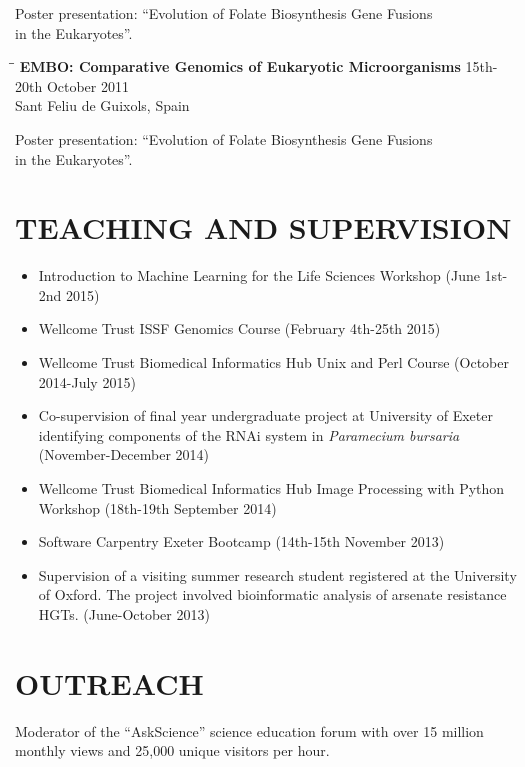 \documentclass{res}
\begin{document}
\begin{resume}
\begin{tabbing}
   \end{tabbing}\vspace{-20pt}      
      Poster presentation: ``Evolution of Folate Biosynthesis Gene Fusions \\in the Eukaryotes''.
      
  
  \vspace{-0.1in}
     \begin{tabbing} 
   \hspace{2in}\= \hspace{2.6in}\= \kill 
    {\bf EMBO: Comparative Genomics of Eukaryotic Microorganisms}
    \>  \> 15th-20th October 2011\\
                         \>    \> Sant Feliu de Guixols, Spain
   \end{tabbing}\vspace{-20pt}      
      Poster presentation: ``Evolution of Folate Biosynthesis Gene Fusions \\in the Eukaryotes''.

  \section{TEACHING AND SUPERVISION}
  \begin{itemize}
          \vspace{-1pt}
      \item Introduction to Machine Learning for the Life Sciences Workshop (June 1st-2nd 2015)
      \item Wellcome Trust ISSF Genomics Course (February 4th-25th 2015)
      \item Wellcome Trust Biomedical Informatics Hub Unix and Perl Course (October 2014-July 2015)
      \item Co-supervision of final year undergraduate project at University of Exeter identifying components of the RNAi system in \textit{Paramecium bursaria} (November-December 2014)
      \item Wellcome Trust Biomedical Informatics Hub Image Processing with Python Workshop (18th-19th September 2014)
      \item Software Carpentry Exeter Bootcamp (14th-15th November 2013)
      \item Supervision of a visiting summer research student registered at the University of Oxford. The project involved bioinformatic analysis of arsenate resistance HGTs. (June-October 2013)
  \end{itemize}

 \section{OUTREACH}          
 \vspace{5pt}
Moderator of the ``AskScience'' science education forum with over 15 million monthly views and 25,000 unique visitors per hour.
\vspace{-5pt}

\end{resume}
\end{document}

